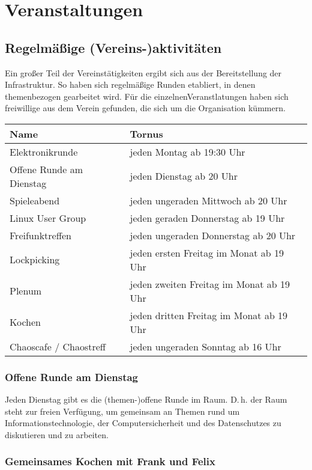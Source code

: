 \documentclass[10pt,DIV16]{scrartcl}
\begin{document}
\section{Veranstaltungen}

\subsection{Regelmäßige (Vereins-)aktivitäten}

Ein großer Teil der Vereinstätigkeiten ergibt sich aus der 
Bereitstellung der Infrastruktur. So haben sich regelmäßige Runden 
etabliert, in denen themenbezogen gearbeitet wird. Für die 
einzelnenVeranstlatungen haben sich freiwillige aus dem Verein 
gefunden, die sich um die Organisation kümmern.

\begin{table}[h]
	\begin{tabular}{l|l}
		Name   &  Tornus \\ \hline
		Elektronikrunde   &  jeden Montag ab 19:30 Uhr\\
		Offene Runde am Dienstag   &  jeden Dienstag ab 20 Uhr\\
		Spieleabend   &  jeden ungeraden Mittwoch ab 20 Uhr\\
		Linux User Group   &  jeden geraden Donnerstag ab 19 Uhr\\
		Freifunktreffen   &  jeden ungeraden Donnerstag ab 20 Uhr\\
		Lockpicking   &  jeden ersten Freitag im Monat ab 19 Uhr\\
		Plenum   &  jeden zweiten Freitag im Monat ab 19 Uhr\\
		Kochen   &  jeden dritten Freitag im Monat ab 19 Uhr\\
		Chaoscafe / Chaostreff   &  jeden ungeraden Sonntag ab 16 Uhr\\
\end{tabular}
\end{table}

\subsubsection{Offene Runde am Dienstag}

Jeden Dienstag gibt es die (themen-)offene Runde im Raum. D.\,h. der Raum
steht zur freien Verfügung, um gemeinsam an Themen rund um
Informationstechnologie, der Computersicherheit und des
Datenschutzes zu diskutieren und zu arbeiten.

\subsubsection{Gemeinsames Kochen mit Frank und Felix}
\end{document}
